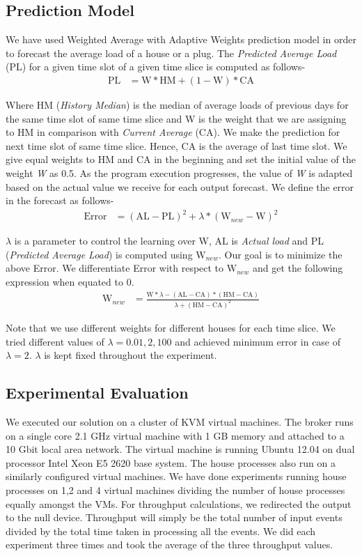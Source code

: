 \subsection{Prediction Model}
We have used Weighted Average with Adaptive Weights prediction model in order to forecast the average load of a house or a plug. The \textit{Predicted Average Load} (PL) for a given time slot of a given time slice is computed as follows-
\begin{align*}
\mbox{PL} &= \mbox{W}*\mbox{HM}  + (1-\mbox{W})*\mbox{CA}
\end{align*}

\noindent Where HM (\textit{History Median}) is the median of average loads of previous days for the same time slot of same time slice and W is the weight that we are assigning to HM in comparison with \textit{Current Average} (CA). We make the prediction for next time slot of same time slice.
Hence, CA is the average of last time slot.
We give equal weights to HM and CA in the beginning and set the initial value of the weight \textit{W} as 0.5. As the program execution progresses, the value of \textit{W} is adapted based on the actual value we receive for each output forecast.
We define the error in the forecast as follows-
\begin{align*}
\mbox{Error} &= (\mbox{AL} - \mbox{PL})^2 + \lambda * (\mbox{W}_{new} - \mbox{W})^2
\end{align*}

\noindent $\lambda$ is a parameter to control the learning over W, AL is \textit{Actual load} and PL (\textit{Predicted Average Load}) is computed using $\mbox{W}_{new}$.
Our goal is to minimize the above Error.
We differentiate Error with respect to $\mbox{W}_{new}$ and get the following expression when equated to 0.
\begin{align*}
\mbox{W}_{new} &= \frac{\mbox{W}*\lambda-(\mbox{AL}-\mbox{CA}) * (\mbox{HM}-\mbox{CA})}{\lambda + (\mbox{HM}-\mbox{CA})^2}
\end{align*}

Note that we use different weights for different houses for each time slice. We tried different values of $\lambda=0.01, 2, 100$ and achieved minimum error in case of $\lambda = 2$. $\lambda$ is kept fixed throughout the experiment.

\subsection{Experimental Evaluation}
We executed our solution on a cluster of KVM virtual machines. The broker runs on a single core 2.1 GHz virtual machine with 1 GB memory and attached to a 10 Gbit local area network. The virtual machine is running Ubuntu 12.04 on dual processor Intel Xeon E5 2620 base system.
The house processes also run on a similarly configured virtual machines. We have done experiments running house processes on 1,2 and 4 virtual machines dividing the number of house processes equally amongst the VMs. For throughput calculations, we redirected the output to the null device. Throughput will simply be the total number of input events divided by the total time taken in processing all the events.
We did each experiment three times and took the average of the three throughput values.

